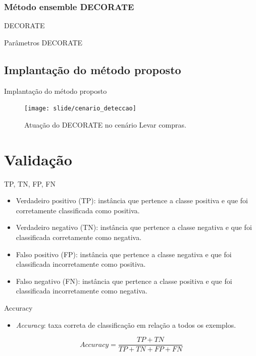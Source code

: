 \documentclass[brazil]{beamer}
\begin{document}
\subsubsection{Método ensemble DECORATE }
\begin{frame}{DECORATE \cite{Melville:2004}}

\end{frame}

\begin{frame}{Parâmetros DECORATE \cite{Melville:2004}}

\end{frame}


\subsection{Implantação do método proposto}
\begin{frame}{Implantação do método proposto}
\begin{figure}[!htb] \centering 
  \centering
  \texttt{[image: slide/cenario\_deteccao]} 
  \caption{Atuação do DECORATE no cenário Levar compras.} 
  \label{fig:cenario_deteccao}
\end{figure}
\end{frame}


\section{Validação}
\begin{frame}{TP, TN, FP, FN \cite{Olson:2008}}
   \begin{itemize}
   \item <1 ->Verdadeiro positivo (TP): instância que pertence a classe positiva e que foi corretamente classificada como positiva.
   \item <2 ->Verdadeiro negativo (TN): instância que pertence a classe negativa e que foi classificada corretamente como negativa.
   \item <3 ->Falso positivo (FP): instância que pertence a classe negativa e que foi classificada  incorretamente como positiva.
   \item <4 ->Falso negativo (FN): instância que pertence a classe positiva e que foi classificada incorretamente como negativa.
   \end{itemize}
\end{frame}
\begin{frame}{Accuracy \cite{Metz:1978}}
   \begin{itemize}
     \item \textit{Accuracy}: taxa correta de classificação em relação a todos os exemplos. 
   \end{itemize}
\vspace{0.3in}
\begin{equation} 
  Accuracy = \frac{TP+TN}{TP+TN+FP+FN} 
  \label{eq:accuracy}
\end{equation}
\end{frame}
\end{document}
